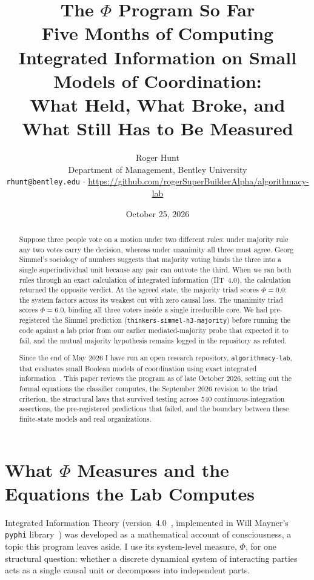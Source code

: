 \documentclass[11pt,a4paper]{article}
\title{\textbf{The $\Phi$ Program So Far}\\[0.4em]
\large Five Months of Computing Integrated Information on Small Models of Coordination:\\
What Held, What Broke, and What Still Has to Be Measured}
\author{Roger Hunt\\
\small Department of Management, Bentley University\\
\small \texttt{rhunt@bentley.edu} $\cdot$ \url{https://github.com/rogerSuperBuilderAlpha/algorithmacy-lab}}
\date{October 25, 2026}
\begin{document}
\maketitle

\begin{abstract}
\noindent
Suppose three people vote on a motion under two different rules: under majority rule any two votes carry the decision, whereas under unanimity all three must agree. Georg Simmel's sociology of numbers suggests that majority voting binds the three into a single superindividual unit because any pair can outvote the third. When we ran both rules through an exact calculation of integrated information (IIT~4.0), the calculation returned the opposite verdict. At the agreed state, the majority triad scores $\Phi = 0.0$: the system factors across its weakest cut with zero causal loss. The unanimity triad scores $\Phi = 6.0$, binding all three voters inside a single irreducible core. We had pre-registered the Simmel prediction (\texttt{thinkers-simmel-h3-majority}) before running the code against a lab prior from our earlier mediated-majority probe that expected it to fail, and the mutual majority hypothesis remains logged in the repository as refuted.

Since the end of May 2026 I have run an open research repository, \texttt{algorithmacy-lab}, that evaluates small Boolean models of coordination using exact integrated information~\cite{albantakis2023iit4,mayner2018pyphi}. This paper reviews the program as of late October 2026, setting out the formal equations the classifier computes, the September 2026 revision to the triad criterion, the structural laws that survived testing across 540 continuous-integration assertions, the pre-registered predictions that failed, and the boundary between these finite-state models and real organizations.
\end{abstract}

\section{What \texorpdfstring{$\Phi$}{Phi} Measures and the Equations the Lab Computes}

Integrated Information Theory (version~4.0~\cite{albantakis2023iit4}, implemented in Will Mayner's \texttt{pyphi} library~\cite{mayner2018pyphi}) was developed as a mathematical account of consciousness, a topic this program leaves aside. I use its system-level measure, $\Phi$, for one structural question: whether a discrete dynamical system of interacting parties acts as a single causal unit or decomposes into independent parts.
\end{document}
